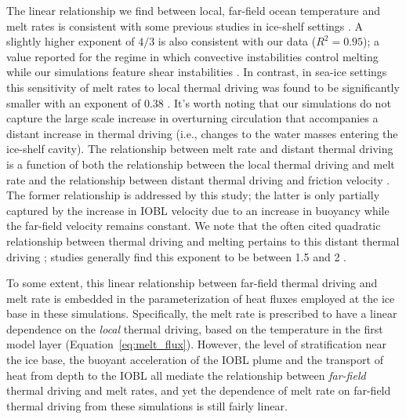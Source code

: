 \documentclass[tc, manuscript]{copernicus}
\begin{document}
The linear relationship we find between local, far-field ocean temperature and melt rates is consistent with some previous studies in ice-shelf settings \citep{holland_response_2008, rignot_rapid_2002, vreugdenhil_stratification_2019}. A slightly higher exponent of $4/3$ is also consistent with our data ($R^2=0.95$); a value reported for the regime in which convective instabilities control melting while our simulations feature shear instabilities \citep{kerr_dissolution_2015}. In contrast, in sea-ice settings this sensitivity of melt rates to local thermal driving was found to be significantly smaller with an exponent of 0.38 \citep{ramudu_large_2018}. It's worth noting that our simulations do not capture the large scale increase in overturning circulation that accompanies a distant increase in thermal driving (i.e., changes to the water masses entering the ice-shelf cavity). The relationship between melt rate and distant thermal driving is a function of both the relationship between the local thermal driving and melt rate and the relationship between distant thermal driving and friction velocity \citep{holland_response_2008}. The former relationship is addressed by this study; the latter is only partially captured by the increase in IOBL velocity due to an increase in buoyancy while the far-field velocity remains constant. We note that the often cited quadratic relationship between thermal driving and melting pertains to this distant thermal driving  \citep{holland_response_2008}; studies generally find this exponent to be between 1.5 and 2 \citep{favier_assessment_2019, jourdain_ocean_2017, little_how_2009}. 

To some extent, this linear relationship between far-field thermal driving and melt rate is embedded in the parameterization of heat fluxes employed at the ice base in these simulations. Specifically, the melt rate is prescribed to have a linear dependence on the \textit{local} thermal driving, based on the temperature in the first model layer (Equation~\ref{eq:melt_flux}). However, the level of stratification near the ice base, the buoyant acceleration of the IOBL plume and the transport of heat from depth to the IOBL all mediate the relationship between \textit{far-field} thermal driving and melt rates, and yet the dependence of melt rate on far-field thermal driving from these simulations is still fairly linear.  
\end{document}
